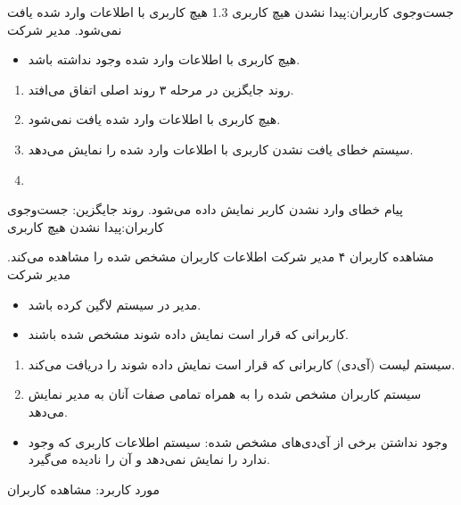 \alternativeflow
{
	جست‌وجوی کاربران:پیدا نشدن هیچ کاربری
}
{1.3}
{
	هیچ کاربری با اطلاعات وارد شده یافت نمی‌شود.
}
{
	مدیر شرکت
}
{}
{
	\begin{itemize}
		
		\item
		هیچ کاربری با اطلاعات وارد شده وجود نداشته باشد.
	\end{itemize}
}
{
	\vspace*{-0.6cm}
	\begin{enumerate}
		\item 
		روند جایگزین در مرحله ۳ روند اصلی اتفاق می‌افتد.
		\item
		هیچ کاربری با اطلاعات وارد شده یافت نمی‌شود.
		\item 
		سیستم خطای یافت نشدن کاربری با اطلاعات وارد شده را نمایش می‌دهد.
		\item
	\end{enumerate}
}
{
	پیام خطای وارد نشدن کاربر نمایش داده می‌شود.
}
{
	روند جایگزین: جست‌وجوی کاربران:پیدا نشدن هیچ کاربری
}



\usecase
{مشاهده کاربران}
{۴}
{مدیر شرکت اطلاعات کاربران مشخص شده را مشاهده می‌کند.}
{مدیر شرکت}
{}
{
		\begin{itemize}
		\item
		مدیر در سیستم لاگین کرده باشد.
		
		\item
		‌کاربرانی که قرار است نمایش داده شوند مشخص شده باشند.
	\end{itemize}
}
{
\begin{enumerate}
	\item 
	سیستم لیست (آی‌دی) کاربرانی که قرار است نمایش داده شوند را دریافت می‌کند.
	
	\item
	سیستم کاربران مشخص شده را به همراه تمامی صفات آنان به مدیر نمایش می‌دهد.
\end{enumerate}
}
{
}
{
	\begin{itemize}
		\item 
		وجود نداشتن برخی از آی‌دی‌های مشخص شده: سیستم اطلاعات کاربری که وجود ندارد را نمایش نمی‌دهد و آن را نادیده می‌گیرد.
	\end{itemize}
}
{مورد کاربرد: مشاهده کاربران}


